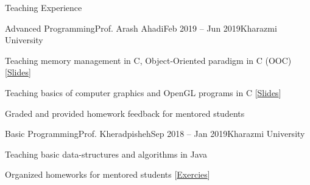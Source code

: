 \documentclass[]{main}
\begin{document}
\begin{section}{Teaching Experience}
 \begin{subsection}{Advanced Programming}{Prof. Arash Ahadi}{Feb 2019 -- Jun 2019}{Kharazmi University}
     \item Teaching memory management in C, Object-Oriented paradigm in C (OOC) [\href{https://github.com/ckoliber/ooc_lecture}{Slides}]
     \item Teaching basics of computer graphics and OpenGL programs in C [\href{https://github.com/ckoliber/opengl}{Slides}]
     \item Graded and provided homework feedback for mentored students
 \end{subsection}

 \begin{subsection}{Basic Programming}{Prof. Kheradpisheh}{Sep 2018 -- Jan 2019}{Kharazmi University}
     \item Teaching basic data-structures and algorithms in Java
     \item Organized homeworks for mentored students [\href{https://github.com/ckoliber/Phy97Sources}{Exercies}]
 \end{subsection}
\end{section}
\end{document}
